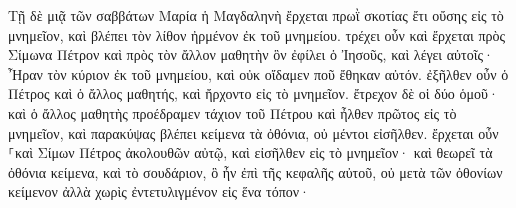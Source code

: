 \documentclass{openreader}
\begin{document}
Τῇ δὲ μιᾷ τῶν σαββάτων Μαρία ἡ Μαγδαληνὴ ἔρχεται πρωῒ σκοτίας ἔτι οὔσης εἰς τὸ μνημεῖον, καὶ βλέπει τὸν λίθον ἠρμένον ἐκ τοῦ μνημείου. 
τρέχει οὖν καὶ ἔρχεται πρὸς Σίμωνα Πέτρον καὶ πρὸς τὸν ἄλλον μαθητὴν ὃν ἐφίλει ὁ Ἰησοῦς, καὶ λέγει αὐτοῖς· Ἦραν τὸν κύριον ἐκ τοῦ μνημείου, καὶ οὐκ οἴδαμεν ποῦ ἔθηκαν αὐτόν. 
ἐξῆλθεν οὖν ὁ Πέτρος καὶ ὁ ἄλλος μαθητής, καὶ ἤρχοντο εἰς τὸ μνημεῖον. 
ἔτρεχον δὲ οἱ δύο ὁμοῦ· καὶ ὁ ἄλλος μαθητὴς προέδραμεν τάχιον τοῦ Πέτρου καὶ ἦλθεν πρῶτος εἰς τὸ μνημεῖον, 
καὶ παρακύψας βλέπει κείμενα τὰ ὀθόνια, οὐ μέντοι εἰσῆλθεν. 
ἔρχεται οὖν ⸀καὶ Σίμων Πέτρος ἀκολουθῶν αὐτῷ, καὶ εἰσῆλθεν εἰς τὸ μνημεῖον· καὶ θεωρεῖ τὰ ὀθόνια κείμενα, 
καὶ τὸ σουδάριον, ὃ ἦν ἐπὶ τῆς κεφαλῆς αὐτοῦ, οὐ μετὰ τῶν ὀθονίων κείμενον ἀλλὰ χωρὶς ἐντετυλιγμένον εἰς ἕνα τόπον· 
\end{document}
